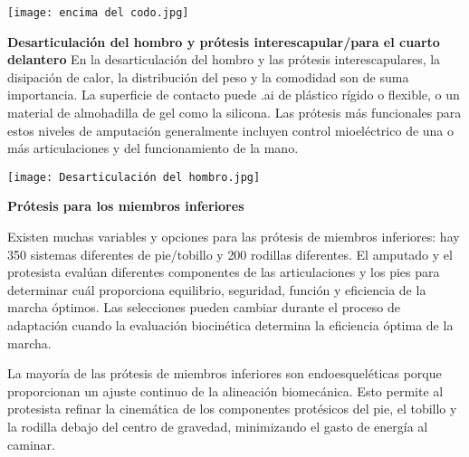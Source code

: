 \documentclass{article}
\begin{document}
\hspace{1cm} 

\begin{minipage}{.89\linewidth}
\centering
\texttt{[image: encima del codo.jpg]}
\end{minipage}


\clearpage

\textbf {Desarticulación del hombro y prótesis interescapular/para el cuarto delantero}
En la desarticulación del hombro y las prótesis interescapulares, la disipación de calor, la distribución del peso y la comodidad son de suma importancia. La superficie de contacto puede .ai de plástico rígido o flexible, o un material de almohadilla de gel como la silicona. Las prótesis más funcionales para estos niveles de amputación generalmente incluyen control mioeléctrico de una o más articulaciones y del funcionamiento de la mano.

\hspace{1cm} 

\begin{minipage}{.89\linewidth}
\centering
\texttt{[image: Desarticulación del hombro.jpg]}
\end{minipage}

\hspace{2cm}
\textbf{Prótesis para los miembros inferiores }

\hspace{1cm} 

Existen muchas variables y opciones para las prótesis de miembros inferiores: hay 350 sistemas diferentes de pie/tobillo y 200 rodillas diferentes. El amputado y el protesista evalúan diferentes componentes de las articulaciones y los pies para determinar cuál proporciona equilibrio, seguridad, función y eficiencia de la marcha óptimos. Las selecciones pueden cambiar durante el proceso de adaptación cuando la evaluación biocinética determina la eficiencia óptima de la marcha.

\hspace{1cm} 

La mayoría de las prótesis de miembros inferiores son endoesqueléticas porque proporcionan un ajuste continuo de la alineación biomecánica. Esto permite al protesista refinar la cinemática de los componentes protésicos del pie, el tobillo y la rodilla debajo del centro de gravedad, minimizando el gasto de energía al caminar.

\hspace{3cm} 
\end{document}
